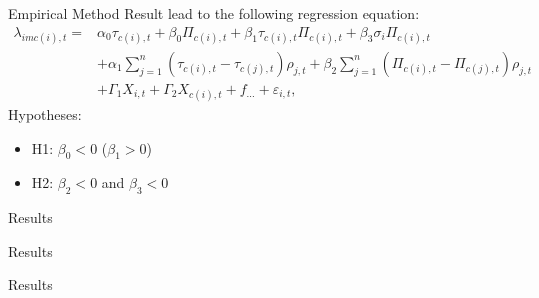 \documentclass{beamer}
\begin{document}
\begin{frame}{Empirical Method}
Result lead to the following regression equation:
\begin{equation}
\begin{aligned}
\lambda_{imc(i),t}=&\alpha_0\tau_{c(i),t}+\beta_0\Pi_{c(i),t}+\beta_1\tau_{c(i),t}\Pi_{c(i),t}+\beta_3\sigma_{i}\Pi_{c(i),t}\\
&+\alpha_1\sum_{j=1}^{n}(\tau_{c(i),t}-\tau_{c(j),t})\rho_{j,t}+\beta_2\sum_{j=1}^{n}(\Pi_{c(i),t}-\Pi_{c(j),t})\rho_{j,t}\\
&+\Gamma_1 X_{i,t}+\Gamma_2 X_{c(i),t}+f_{...}+\varepsilon_{i,t},
\label{eq:optimal leverage empirically 1}
\end{aligned}
\end{equation}
Hypotheses:
\begin{itemize}
	\item H1: $\beta_0<0$ ($\beta_1>0$) 
	\item H2: $\beta_2<0$ and $\beta_3<0$
\end{itemize}
\end{frame}


\begin{frame}{Results}
\begin{center}
	\begin{tiny}		
	\end{tiny}
\end{center}

\end{frame}

\begin{frame}{Results}
\begin{center}
	\begin{tiny}		
	\end{tiny}
\end{center}

\end{frame}

\begin{frame}{Results}
\begin{center}
	\begin{tiny}		
	\end{tiny}
\end{center}
\end{frame}
\end{document}
